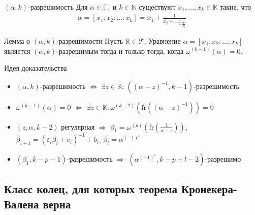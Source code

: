 \documentclass[8pt, xcolor=x11names]{beamer}
\begin{document}
\begin{frame}
    \begin{block}{$(\alpha, k)$-разрешимость}
        Для $\alpha\in\mathbb{F}_1$ и $k\in\mathbb{N}$ существуют $x_{1},\ldots,x_{k}\in\mathbb{K}$ такие, что
        \begin{eqnarray*}
            \alpha = [x_{1}:x_{2}:\ldots:x_{k}] = x_{1} + \frac{1}{
                x_{2} + \frac{1}{
                    \dots + \frac{1}{x_{k}}
                }
            }
        \end{eqnarray*}
    \end{block}

    \begin{block}{Лемма о $(\alpha, k)$-разрешимости}
        Пусть $\mathbb{K}\in\mathcal{T}$.
        Уравнение $\alpha = [x_{1}:x_{2}:\ldots:x_{k}]$ является $(\alpha, k)$-разрешимым тогда и только тогда, когда $\omega^{(k-1)}(\alpha)=0$.
    \end{block}
    
    \begin{block}{Идея доказательства}
        \begin{itemize}
            \item $(\alpha,k)$-разрешимость $\Longleftrightarrow$ $\exists z\in\mathbb{K}$: $((\alpha-z)^{-1},k-1)$-разрешимость
            
            \item $\omega^{(k-1)}(\alpha) = 0$ $\Longleftrightarrow$ $\exists z\in\mathbb{K}: \omega^{(k-2)}(\textrm{fr}((\alpha-z)^{-1})) = 0$
            
            \item $(z, \alpha, k-2)$ регулярная $\Rightarrow$ $\beta_{1}=\omega^{(p)}\left(\textrm{fr}\left(\frac{1}{\alpha-z}\right)\right)$, $\beta_{i+1}=(\varepsilon_{i}\beta_{i}+c_{i})^{-1}+b_{i}$, $\beta_{l}=\alpha^{(-1)^{\varepsilon}}$
            
            \item $(\beta_{1}, k-p-1)$-разрешимость $\Rightarrow$ $(\alpha^{(-1)^{\varepsilon}}, k-p+l-2)$-разрешимо
        \end{itemize}
    \end{block}
\end{frame}

\subsection{Класс колец, для которых теорема Кронекера-Валена верна}
\end{document}
